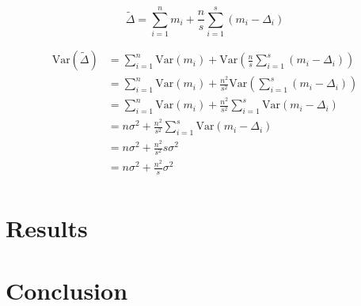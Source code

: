 \documentclass[11pt]{article}
\begin{document}
\[
\tilde{\Delta} = \sum_{i = 1}^{n} m_i + \frac{n}{s} \sum_{i = 1}^{s} (m_i - \Delta_i)
\]

\[
\begin{aligned}
\mathrm{Var}(\tilde{\Delta}) &= \sum_{i = 1}^{n} \mathrm{Var}(m_i) + \mathrm{Var}(\frac{n}{s} \sum_{i = 1}^{s} (m_i - \Delta_i)) \\
&= \sum_{i = 1}^{n} \mathrm{Var}(m_i) + \frac{n^2}{s^2} \mathrm{Var}(\sum_{i = 1}^{s} (m_i - \Delta_i)) \\
&= \sum_{i = 1}^{n} \mathrm{Var}(m_i) + \frac{n^2}{s^2} \sum_{i = 1}^{s} \mathrm{Var}(m_i - \Delta_i) \\
&= n \sigma^2 + \frac{n^2}{s^2} \sum_{i = 1}^{s} \mathrm{Var}(m_i - \Delta_i) \\
&= n \sigma^2 + \frac{n^2}{s^2} s \sigma^2 \\
&= n \sigma^2 + \frac{n^2}{s} \sigma^2 \\
\end{aligned}
\]

\newpage

\section{Results}

\newpage

\section{Conclusion}

\newpage



\end{document}

